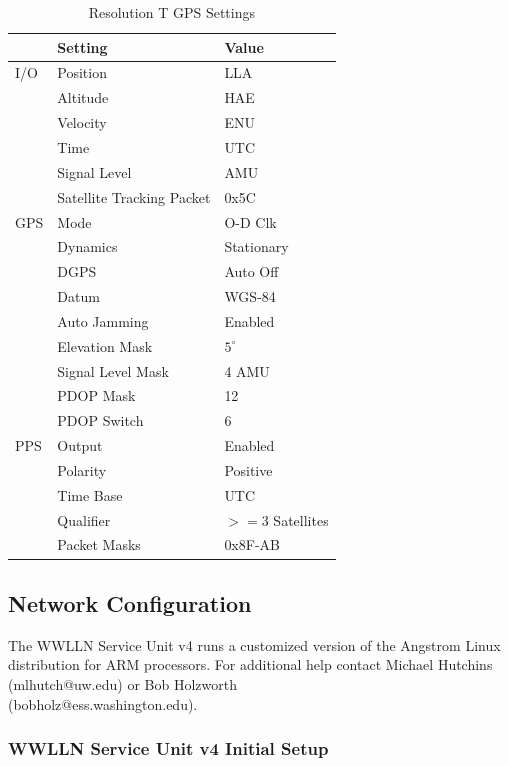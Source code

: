 \begin{table}[h!]
\begin{center}
\begin{tabular}{|p{.5in}|p{2in}|p{1.5in}|}
\hline
{\bf } &	{\bf Setting} &	{\bf Value}\\
\hline
\rule{0pt}{3ex}
I/O	&Position	&	LLA\\ 
	&Altitude	&	HAE\\ 
	&Velocity	&	ENU\\ 
	&Time	&	UTC\\ 
	&Signal Level	&	AMU\\ 
	&Satellite Tracking Packet	&	0x5C\\ 
\hline
GPS	&Mode	&	O-D Clk\\ 
	&Dynamics	&	Stationary\\
	&DGPS	&	Auto Off\\
	&Datum	&	WGS-84\\
	&Auto Jamming	&	Enabled\\
	&Elevation Mask	&	$5^\circ$\\
	&Signal Level Mask	&	4 AMU\\
	&PDOP Mask	&	12\\
	&PDOP Switch	&	6\\
\hline
PPS	&Output	&	Enabled\\ 
	&Polarity	&	Positive\\ 
	&Time Base	&	UTC\\ 
	&Qualifier	&	$>=3$ Satellites\\ 
	&Packet Masks	&	0x8F-AB\\ 
\hline
\end{tabular}
\end{center}
\label{su:table:suGPSSettings}
\caption{Resolution T GPS Settings}
\end{table}

\clearpage

\subsection{Network Configuration}
\label{su:subsection:suSoftware}

The WWLLN Service Unit v4 runs a customized version of the Angstrom Linux distribution for ARM processors.
For additional help contact Michael Hutchins (\mbox{mlhutch@uw.edu}) or Bob Holzworth 
\\
(\mbox{bobholz@ess.washington.edu}).

\subsubsection{WWLLN Service Unit v4 Initial Setup}

